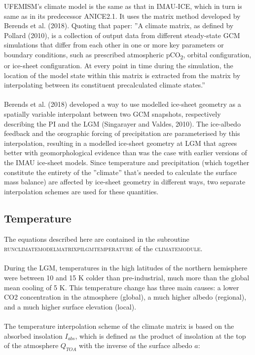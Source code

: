 \documentclass{article}
\begin{document}
UFEMISM's climate model is the same as that in IMAU-ICE, which in turn is same as in its predecessor ANICE2.1. It uses the matrix method developed by Berends et al. (2018). Quoting that paper: ''A climate matrix, as defined by Pollard (2010), is a collection of output data from different steady-state GCM simulations that differ from each other in one or more key parameters or boundary conditions, such as prescribed atmospheric pCO\textsubscript{2}, orbital configuration, or ice-sheet configuration. At every point in time during the simulation, the location of the model state within this matrix is extracted from the matrix by interpolating between its constituent precalculated climate states.''\\
\\
Berends et al. (2018) developed a way to use modelled ice-sheet geometry as a spatially variable interpolant between two GCM snapshots, respectively describing the PI and the LGM (Singarayer and Valdes, 2010). The ice-albedo feedback and the orographic forcing of precipitation are parameterised by this interpolation, resulting in a modelled ice-sheet geometry at LGM that agrees better with geomorphological evidence than was the case with earlier versions of the IMAU ice-sheet models. Since temperature and precipitation (which together constitute the entirety of the ''climate'' that's needed to calculate the surface mass balance) are affected by ice-sheet geometry in different ways, two separate interpolation schemes are used for these quantities.\\

\subsection{Temperature}

The equations described here are contained in the subroutine \textsc{run\textunderscore climate\textunderscore model\textunderscore matrix\textunderscore pi\textunderscore lgm\textunderscore temperature} of the \textsc{climate\textunderscore module}.\\
\\
During the LGM, temperatures in the high latitudes of the northern hemisphere were between 10 and 15 K colder than pre-industrial, much more than the global mean cooling of 5 K. This temperature change has three main causes: a lower CO2 concentration in the atmosphere (global), a much higher albedo (regional), and a much higher surface elevation (local).\\
\\
The temperature interpolation scheme of the climate matrix is based on the absorbed insolation $I_{abs}$, which is defined as the product of insolation at the top of the atmosphere $Q_{TOA}$ with the inverse of the surface albedo $a$:
\end{document}
